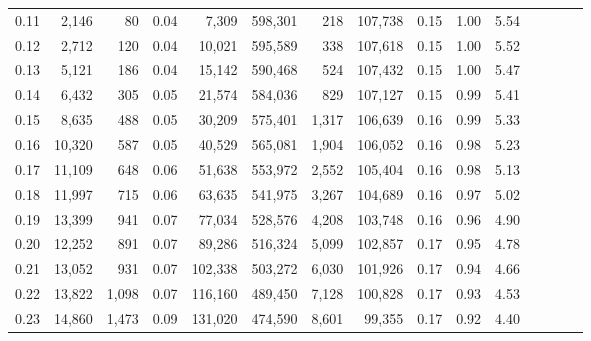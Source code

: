 \begin{tabular}{rrrcrrrrrrrrrrr}
0.11 &   2,146 &     80 &                                       0.04 &    7,309 &  598,301 &      218 &  107,738 &  0.15 &  1.00 &                         5.54 \\
0.12 &   2,712 &    120 &                                       0.04 &   10,021 &  595,589 &      338 &  107,618 &  0.15 &  1.00 &                         5.52 \\
0.13 &   5,121 &    186 &                                       0.04 &   15,142 &  590,468 &      524 &  107,432 &  0.15 &  1.00 &                         5.47 \\
0.14 &   6,432 &    305 &                                       0.05 &   21,574 &  584,036 &      829 &  107,127 &  0.15 &  0.99 &                         5.41 \\
0.15 &   8,635 &    488 &                                       0.05 &   30,209 &  575,401 &    1,317 &  106,639 &  0.16 &  0.99 &                         5.33 \\
0.16 &  10,320 &    587 &                                       0.05 &   40,529 &  565,081 &    1,904 &  106,052 &  0.16 &  0.98 &                         5.23 \\
0.17 &  11,109 &    648 &                                       0.06 &   51,638 &  553,972 &    2,552 &  105,404 &  0.16 &  0.98 &                         5.13 \\
0.18 &  11,997 &    715 &                                       0.06 &   63,635 &  541,975 &    3,267 &  104,689 &  0.16 &  0.97 &                         5.02 \\
0.19 &  13,399 &    941 &                                       0.07 &   77,034 &  528,576 &    4,208 &  103,748 &  0.16 &  0.96 &                         4.90 \\
0.20 &  12,252 &    891 &                                       0.07 &   89,286 &  516,324 &    5,099 &  102,857 &  0.17 &  0.95 &                         4.78 \\
0.21 &  13,052 &    931 &                                       0.07 &  102,338 &  503,272 &    6,030 &  101,926 &  0.17 &  0.94 &                         4.66 \\
0.22 &  13,822 &  1,098 &                                       0.07 &  116,160 &  489,450 &    7,128 &  100,828 &  0.17 &  0.93 &                         4.53 \\
0.23 &  14,860 &  1,473 &                                       0.09 &  131,020 &  474,590 &    8,601 &   99,355 &  0.17 &  0.92 &                         4.40 \\

\end{tabular}
